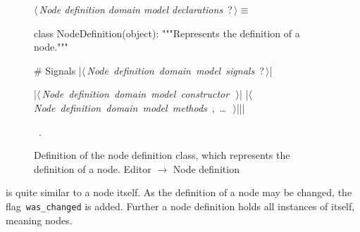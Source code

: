 \documentclass[%
    a4paper,    %
    justified,  %
    nobib,      %
    openany     %
]{tufte-book}
\begin{document}
\begin{figure}
\begin{flushleft} \small
\begin{minipage}{\linewidth}\label{scrap120}\raggedright\small
{} $\langle\,${\itshape Node definition domain model declarations}\nobreak\ {\footnotesize {?}}$\,\rangle\equiv$
\vspace{-1ex}
\begin{pythoncode}
class NodeDefinition(object):
    """Represents the definition of a node."""

    # Signals
    |\hbox{$\langle\,${\itshape Node definition domain model signals}\nobreak\ {\footnotesize ?}$\,\rangle$}|

    |\hbox{$\langle\,${\itshape Node definition domain model constructor}\nobreak\ {\footnotesize {}}$\,\rangle$}|
    |\hbox{$\langle\,${\itshape Node definition domain model methods}\nobreak\ {\footnotesize {}, \ldots\ }$\,\rangle$}||\NWsep|
\end{pythoncode}
\vspace{1.5ex}
\footnotesize
\begin{list}{}{\setlength{\itemsep}{-\parsep}\setlength{\itemindent}{-\leftmargin}}
\item \NWtxtMacroRefIn\ .

\item{}
\end{list}
\end{minipage}\vspace{4ex}
\end{flushleft}
\caption{Definition of the node definition class, which represents the definition
  of a node.
  \newline{}\newline{}Editor $\rightarrow$ Node definition}
\label{editor:lst:node-definition}
\end{figure}

 is quite similar to a node itself. As the
definition of a node may be changed, the flag~\verb=was_changed= is added.
Further a node definition holds all instances of itself, meaning nodes.
\end{document}
